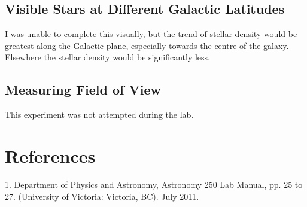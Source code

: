 \documentclass{article}
\begin{document}
\subsection{Visible Stars at Different Galactic Latitudes}
I was unable to complete this visually, but the trend of stellar density would be greatest along the Galactic plane, especially towards the centre of the galaxy. Elsewhere the stellar density would be significantly less.
\subsection{Measuring Field of View}
This experiment was not attempted during the lab.
\section{References}
1. Department of Physics and Astronomy, Astronomy 250 Lab Manual, pp. 25 to 27. (University of Victoria: Victoria, BC). July 2011.\\
\end{document}
